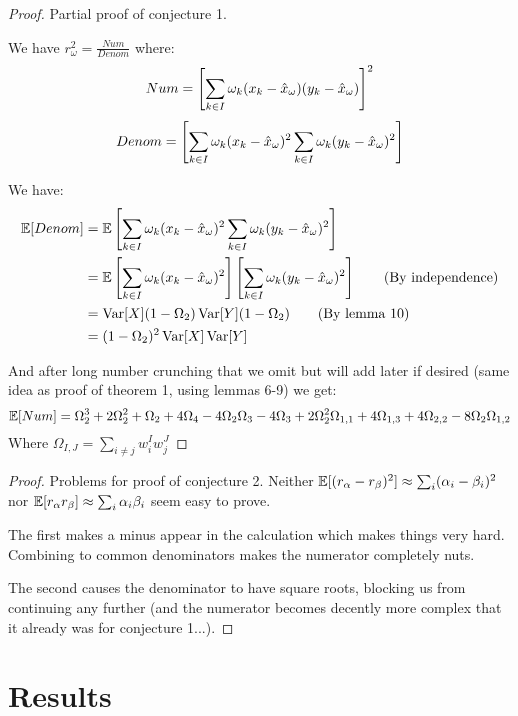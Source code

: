 \documentclass[11pt]{hw-template}
\begin{document}
  \begin{proof} Partial proof of conjecture 1.
    
    We have $r_\omega^2 = \frac{Num}{Denom}$ where:
    $$Num = \left[\sum_{k \in I} \omega_k(x_k - \hat{x}_\omega)(y_k - \hat{x}_\omega)\right]^2$$
    $$Denom = \left[\sum_{k \in I} \omega_k (x_k - \hat{x}_\omega)^2\sum_{k \in I} \omega_k(y_k - \hat{x}_\omega)^2\right]$$
    
    
    We have:
    \begin{align*}
      \operatorname{\mathbb{E}}[Denom] 
      &= \operatorname{\mathbb{E}}\left[\sum_{k \in I} \omega_k (x_k - \hat{x}_\omega)^2\sum_{k \in I} \omega_k(y_k - \hat{x}_\omega)^2\right]\\
      &= \operatorname{\mathbb{E}}\left[\sum_{k \in I} \omega_k (x_k - \hat{x}_\omega)^2\right]\left[\sum_{k \in I} \omega_k(y_k - \hat{x}_\omega)^2\right] \tag{By independence}\\
      &= \operatorname{Var}[X] (1 - \Omega_2) \operatorname{Var}[Y] (1 - \Omega_2) \tag{By lemma 10}\\
      &= (1 - \Omega_2)^2 \operatorname{Var}[X]\operatorname{Var}[Y] 
    \end{align*}
    
    And after long number crunching that we omit but will add later if desired (same idea as proof of theorem 1, using lemmas 6-9) we get:
    $$\operatorname{\mathbb{E}}[Num] = \Omega_2^3 + 2\Omega_2^2 + \Omega_2 + 4\Omega_4 - 4\Omega_2\Omega_3 -4\Omega_3 + 2\Omega_2^2\Omega_{1, 1} + 4\Omega_{1, 3} + 4\Omega_{2, 2} -8\Omega_2\Omega_{1, 2}$$
    Where $\Omega_{I, J} = \sum_{i \neq j} w_i^Iw_j^J$
    
  \end{proof}

  \begin{proof} Problems for proof of conjecture 2.
    Neither $\operatorname{\mathbb{E}}[(r_\alpha - r_\beta)^2] \approx \sum_i (\alpha_i - \beta_i)^2$ nor $\operatorname{\mathbb{E}}[r_\alpha r_\beta] \approx \sum_i \alpha_i \beta_i$ seem easy to prove.
    
    The first makes a minus appear in the calculation which makes things very hard. Combining to common denominators makes the numerator completely nuts.
    
    The second causes the denominator to have square roots, blocking us from continuing any further (and the numerator becomes decently more complex that it already was for conjecture 1...).
  \end{proof}

\section*{Results}
\end{document}
